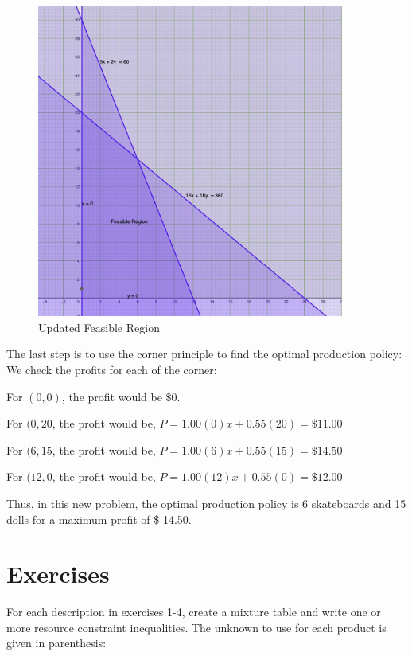 \documentclass[
  letterpaper,
  DIV=11,
  numbers=noendperiod]{scrreprt}
\begin{document}
\begin{figure}

{\centering \includegraphics[width=0.9\textwidth,height=\textheight]{images/b.jpeg}

}

\caption{Updated Feasible Region}

\end{figure}

The last step is to use the corner principle to find the optimal
production policy: We check the profits for each of the corner:

For \((0,0)\), the profit would be \(\$0\).

For \((0,20\), the profit would be, \(P=1.00 (0)x+0.55(20)=\$11.00\)

For \((6,15\), the profit would be, \(P=1.00 (6)x+0.55(15)=\$14.50\)

For \((12,0\), the profit would be, \(P=1.00 (12)x+0.55(0)=\$12.00\)

Thus, in this new problem, the optimal production policy is 6
skateboards and 15 dolls for a maximum profit of \$ 14.50.

\hypertarget{exercises-2}{%
\section{Exercises}\label{exercises-2}}

For each description in exercises 1-4, create a mixture table and write
one or more resource constraint inequalities. The unknown to use for
each product is given in parenthesis:
\end{document}
